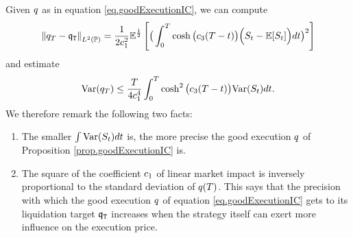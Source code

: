\documentclass[10pt,a4paper]{article}
\begin{document}
\begin{remark}\label{remark.varianceOfLiquidationError}
Given  $\inventory$ as in equation \eqref{eq.goodExecutionIC}, we can compute 
\begin{equation*}
\norm[\inventory_\timeHorizon-\liquidationTarget]_{\Ltwo(\Prob)}
= \frac{1}{2\coeffMarketImpact\squared} \Expectation^{\half}
\left[\big(
\int_{0}^{\timeHorizon} \cosh\big(\ratioAversionOverImpact (T-t)\big) \Big(
\fundamentalPrice_t-\Expectation[\fundamentalPrice_t]
\Big)dt
\big)\squared\right]
\end{equation*}
and estimate
\begin{equation*}
\Variance(\inventory_\timeHorizon)
\leq \frac{T}{4\coeffMarketImpact^{4}} 
\int_{0}^{T} \cosh\squared\big(\ratioAversionOverImpact (T-t)\big) \Variance(\fundamentalPrice_t)dt.
\end{equation*}
We therefore remark the following two facts:
\begin{enumerate}
	\item The smaller $\int \Variance(\fundamentalPrice_t)dt$ is, the more precise the good execution $\inventory$ of Proposition \ref{prop.goodExecutionIC} is.
	\item The square of the coefficient $\coeffMarketImpact$ of linear market impact is inversely proportional to the standard deviation of $\inventory(T)$. This says that the precision with which the good execution $\inventory$ of equation \eqref{eq.goodExecutionIC} gets to its liquidation target $\liquidationTarget$ increases when the strategy itself can exert more influence on the execution price. 
\end{enumerate}
\end{remark}
\end{document}
